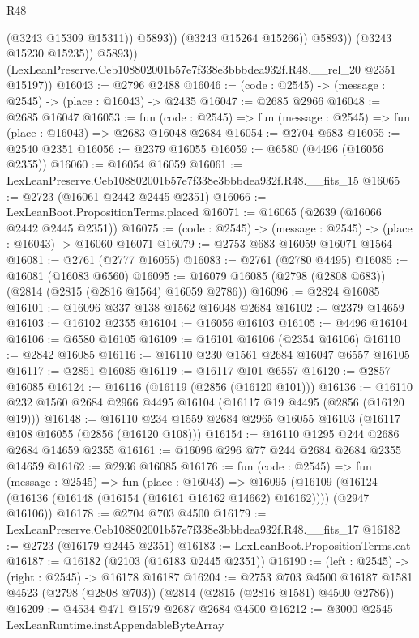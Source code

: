 \begin{lexlean}{R48}
\begin{coremodule}
                        (@3243 @15309 @15311))
                      @5893))
                  (@3243 @15264 @15266))
                @5893))
            (@3243 @15230 @15235))
          @5893))
      (LexLeanPreserve.Ceb108802001b57e7f338e3bbbdea932f.R48.__rel_20 @2351 @15197))
@16043 := @2796 @2488
@16046 := (code : @2545) -> (message : @2545) -> (place : @16043) -> @2435
@16047 := @2685 @2966
@16048 := @2685 @16047
@16053 := fun (code : @2545) => fun (message : @2545) => fun (place : @16043) => @2683 @16048 @2684
@16054 := @2704 @683
@16055 := @2540 @2351
@16056 := @2379 @16055
@16059 := @6580 (@4496 (@16056 @2355))
@16060 := @16054 @16059
@16061 := LexLeanPreserve.Ceb108802001b57e7f338e3bbbdea932f.R48.__fits_15
@16065 := @2723 (@16061 @2442 @2445 @2351)
@16066 := LexLeanBoot.PropositionTerms.placed
@16071 := @16065 (@2639 (@16066 @2442 @2445 @2351))
@16075 := (code : @2545) -> (message : @2545) -> (place : @16043) -> @16060 @16071
@16079 := @2753 @683 @16059 @16071 @1564
@16081 := @2761 (@2777 @16055)
@16083 := @2761 (@2780 @4495)
@16085 := @16081 (@16083 @6560)
@16095 := @16079 @16085 (@2798 (@2808 @683)) (@2814 (@2815 (@2816 @1564) @16059 @2786))
@16096 := @2824 @16085
@16101 := @16096 @337 @138 @1562 @16048 @2684
@16102 := @2379 @14659
@16103 := @16102 @2355
@16104 := @16056 @16103
@16105 := @4496 @16104
@16106 := @6580 @16105
@16109 := @16101 @16106 (@2354 @16106)
@16110 := @2842 @16085
@16116 := @16110 @230 @1561 @2684 @16047 @6557 @16105
@16117 := @2851 @16085
@16119 := @16117 @101 @6557
@16120 := @2857 @16085
@16124 := @16116 (@16119 (@2856 (@16120 @101)))
@16136 := @16110 @232 @1560 @2684 @2966 @4495 @16104 (@16117 @19 @4495 (@2856 (@16120 @19)))
@16148 := @16110 @234 @1559 @2684 @2965 @16055 @16103 (@16117 @108 @16055 (@2856 (@16120 @108)))
@16154 := @16110 @1295 @244 @2686 @2684 @14659 @2355
@16161 := @16096 @296 @77 @244 @2684 @2684 @2355 @14659
@16162 := @2936 @16085
@16176 := fun (code : @2545) =>
  fun (message : @2545) =>
  fun (place : @16043) =>
  @16095 (@16109 (@16124 (@16136 (@16148 (@16154 (@16161 @16162 @14662) @16162)))) (@2947 @16106))
@16178 := @2704 @703 @4500
@16179 := LexLeanPreserve.Ceb108802001b57e7f338e3bbbdea932f.R48.__fits_17
@16182 := @2723 (@16179 @2445 @2351)
@16183 := LexLeanBoot.PropositionTerms.cat
@16187 := @16182 (@2103 (@16183 @2445 @2351))
@16190 := (left : @2545) -> (right : @2545) -> @16178 @16187
@16204 := @2753
    @703
    @4500
    @16187
    @1581
    @4523
    (@2798 (@2808 @703))
    (@2814 (@2815 (@2816 @1581) @4500 @2786))
@16209 := @4534 @471 @1579 @2687 @2684 @4500
@16212 := @3000 @2545 LexLeanRuntime.instAppendableByteArray

\end{coremodule}
\end{lexlean}
